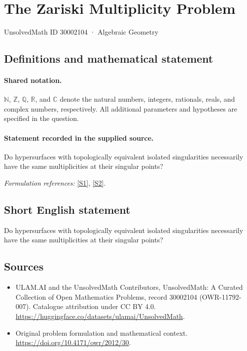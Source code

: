 \documentclass[11pt]{article}
\newcommand{\sref}[2]{\hyperlink{source:#1:#2}{[S#2]}}
\begin{document}
\setcounter{section}{30002103}
\section{The Zariski Multiplicity Problem}\label{30002104}
{\small UnsolvedMath ID 30002104 · Algebraic Geometry}
\subsection{Definitions and mathematical statement}

\paragraph{Shared notation.}$\mathbb N$, $\mathbb Z$, $\mathbb Q$, $\mathbb R$, and $\mathbb C$ denote the natural numbers, integers, rationals, reals, and complex numbers, respectively. All additional parameters and hypotheses are specified in the question.


\paragraph{Statement recorded in the supplied source.}
Do hypersurfaces with topologically equivalent isolated singularities necessarily have the same multiplicities at their singular points?
\par\smallskip\textit{Formulation references:} \sref{30002104}{1}, \sref{30002104}{2}.
\subsection{Short English statement}
Do hypersurfaces with topologically equivalent isolated singularities necessarily have the same multiplicities at their singular points?
\subsection{Sources}
\begin{itemize}
\item[\hypertarget{source:30002104:1}{S1}] ULAM.AI and the UnsolvedMath Contributors, UnsolvedMath: A Curated Collection of Open Mathematics Problems, record 30002104 (OWR-11792-007). Catalogue attribution under CC BY 4.0.
\url{https://huggingface.co/datasets/ulamai/UnsolvedMath}.
\item[\hypertarget{source:30002104:2}{S2}] Original problem formulation and mathematical context.
\url{https://doi.org/10.4171/owr/2012/30}.
\end{itemize}
\label{end:30002104}
\end{document}
